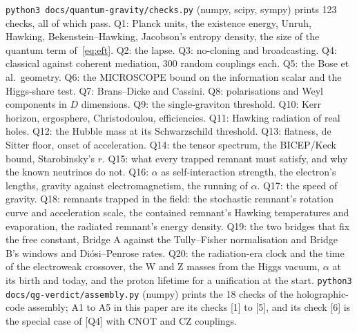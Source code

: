 \documentclass[11pt,a4paper]{article}
\theoremstyle{definition}
\theoremstyle{remark}
\newcommand{\chk}[1]{\textsf{[#1]}}
\newcommand{\nw}[1]{{\color{newc}#1}}
\newcommand{\vtag}{{\color{newc}\textsf{\scriptsize[v5.1]}}}
\theoremstyle{definition}
\begin{document}
\texttt{python3 docs/quantum-gravity/checks.py} (numpy, scipy, sympy) prints \nw{123} checks, all of which pass. Q1: Planck units, the existence
energy, Unruh, Hawking, Bekenstein--Hawking, Jacobson's entropy density, the size of the quantum term of~\eqref{eq:eft}. Q2: the lapse. Q3:
no-cloning and broadcasting. Q4: classical against coherent mediation, 300 random couplings each. Q5: the Bose et al.\ geometry. Q6: the
MICROSCOPE bound on the information scalar and the Higgs-share test. Q7: Brans--Dicke and Cassini. Q8: polarisations and Weyl components
in $D$ dimensions. Q9: the single-graviton threshold. Q10: Kerr horizon, ergosphere, Christodoulou, efficiencies. Q11: Hawking radiation of
real holes. Q12: the Hubble mass at its Schwarzschild threshold. Q13: flatness, de Sitter floor, onset of acceleration. Q14: the tensor
spectrum, the BICEP/Keck bound, Starobinsky's $r$. Q15: what every trapped remnant must satisfy, and why the known neutrinos do not. Q16: $\alpha$ as self-interaction strength,
the electron's lengths, gravity against electromagnetism, the running of $\alpha$. Q17: the speed of gravity. Q18: remnants trapped in the field: the stochastic remnant's rotation curve and
acceleration scale, the contained remnant's Hawking temperatures and evaporation, the radiated remnant's energy density. Q19: the two bridges that fix the free constant, Bridge A against the Tully--Fisher
normalisation and Bridge B's windows and Di\'osi--Penrose rates. \nw{\vtag{} Q20: the radiation-era clock and the time of
the electroweak crossover, the W and Z masses from the Higgs vacuum, $\alpha$ at its birth and today, and the proton lifetime for a
unification at the start.}
\texttt{python3 docs/qg-verdict/assembly.py} (numpy) prints the 18 checks of the holographic-code assembly; A1 to A5 in this paper are its
checks [1] to [5], and its check [6] is the special case of \chk{Q4} with CNOT and CZ couplings.
\end{document}
